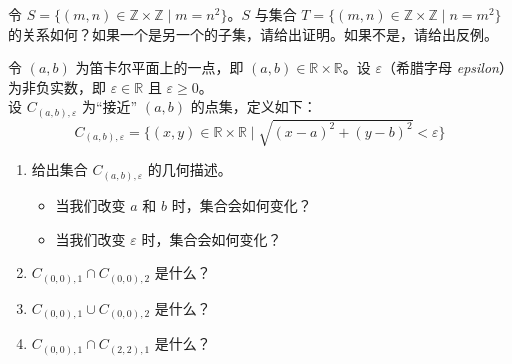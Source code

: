 \begin{exercise}
    令 $S = \{(m, n) \in \mathbb{Z} \times \mathbb{Z} \mid m = n^2\}$。$S$ 与集合 $T = \{(m, n) \in \mathbb{Z} \times \mathbb{Z} \mid n = m^2\}$ 的关系如何？如果一个是另一个的子集，请给出证明。如果不是，请给出反例。
\end{exercise}

\begin{exercise}
    令 $(a,b)$ 为笛卡尔平面上的一点，即 $(a,b) \in \mathbb{R} \times \mathbb{R}$。设 $\varepsilon$（希腊字母 \emph{epsilon}）为非负实数，即 $\varepsilon \in \mathbb{R}$ 且 $\varepsilon \ge 0$。\\
    设 $C_{(a,b),\varepsilon}$ 为``接近'' $(a, b)$ 的点集，定义如下：
    \[C_{(a,b),\varepsilon} = \Big\{(x, y) \in \mathbb{R} \times \mathbb{R} \mid \sqrt{(x - a)^2 + (y - b)^2} < \varepsilon\Big\}\]
    \begin{enumerate}
        \item 给出集合 $C_{(a,b),\varepsilon}$ 的几何描述。
        \begin{itemize}
            \item 当我们改变 $a$ 和 $b$ 时，集合会如何变化？
            \item 当我们改变 $\varepsilon$ 时，集合会如何变化？
        \end{itemize}
        \item $C_{(0,0),1} \cap C_{(0,0),2}$ 是什么？
        \item $C_{(0,0),1} \cup C_{(0,0),2}$ 是什么？
        \item $C_{(0,0),1} \cap C_{(2,2),1}$ 是什么？
    \end{enumerate}
\end{exercise}

